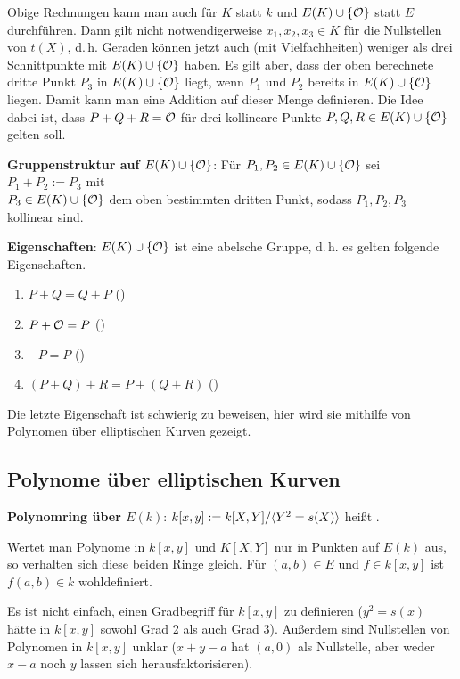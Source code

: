 Obige Rechnungen kann man auch für $K$ statt $k$ und $E(K) \cup \{\mathcal{O}\}$ statt $E$ durchführen.
Dann gilt nicht notwendigerweise $x_1, x_2, x_3 \in K$ für die Nullstellen von $t(X)$, d.\,h.
Geraden können jetzt auch (mit Vielfachheiten) weniger als drei Schnittpunkte mit
$E(K) \cup \{\mathcal{O}\}$ haben.
Es gilt aber, dass der oben berechnete dritte Punkt $P_3$ in $E(K) \cup \{\mathcal{O}\}$ liegt,
wenn $P_1$ und $P_2$ bereits in $E(K) \cup \{\mathcal{O}\}$ liegen.
Damit kann man eine Addition auf dieser Menge definieren.
Die Idee dabei ist, dass $P + Q + R = \mathcal{O}$ für drei kollineare Punkte $P, Q, R \in E(K) \cup \{\mathcal{O}\}$
gelten soll.

\textbf{Gruppenstruktur auf $E(K) \cup \{\mathcal{O}\}$}:
Für $P_1, P_2 \in E(K) \cup \{\mathcal{O}\}$ sei $P_1 + P_2 := \overline{P_3}$ mit\\
$P_3 \in E(K) \cup \{\mathcal{O}\}$ dem oben bestimmten dritten Punkt, sodass $P_1, P_2, P_3$ kollinear
sind.

\textbf{Eigenschaften}:
$E(K) \cup \{\mathcal{O}\}$ ist eine abelsche Gruppe, d.\,h. es gelten folgende Eigenschaften.
\begin{enumerate}
    \item
    $P + Q = Q + P$
    ()

    \item
    $P + \mathcal{O} = P$
    ()

    \item
    $-P = \overline{P}$
    ()

    \item
    $(P + Q) + R = P + (Q + R)$
    ()
\end{enumerate}
Die letzte Eigenschaft ist schwierig zu beweisen,
hier wird sie mithilfe von Polynomen über elliptischen Kurven gezeigt.

\pagebreak

\subsection{%
    Polynome über elliptischen Kurven%
}

\textbf{Polynomring über $E(k)$}:
$k[x, y] := k[X, Y]/\langle Y^2 = s(X)\rangle$ heißt .

Wertet man Polynome in $k[x, y]$ und $K[X, Y]$ nur in Punkten auf $E(k)$ aus, so verhalten
sich diese beiden Ringe gleich.
Für $(a, b) \in E$ und $f \in k[x, y]$ ist $f(a, b) \in k$ wohldefiniert.

Es ist nicht einfach, einen Gradbegriff für $k[x, y]$ zu definieren
($y^2 = s(x)$ hätte in $k[x, y]$ sowohl Grad 2 als auch Grad 3).
Außerdem sind Nullstellen von Polynomen in $k[x, y]$ unklar
($x + y - a$ hat $(a, 0)$ als Nullstelle,
aber weder $x - a$ noch $y$ lassen sich herausfaktorisieren).

